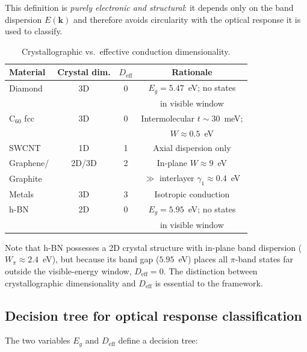\documentclass[twocolumn,showpacs,preprintnumbers,amsmath,amssymb,prb]{revtex4-2}
\begin{document}
This definition is \emph{purely electronic and structural}: it depends
only on the band dispersion $E(\bm{k})$ and therefore avoids
circularity with the optical response it is used to classify.

\begin{table}[h]
\caption{Crystallographic vs.\ effective conduction dimensionality.}
\label{tab:Deff}
\begin{ruledtabular}
\begin{tabular}{lccc}
  Material & Crystal dim. & $D_\mathrm{eff}$ & Rationale \\
  \hline
  Diamond      & 3D     & 0 & $E_g = 5.47$~eV; no states \\
               &        &   & in visible window \\
  C$_{60}$ fcc & 3D     & 0 & Intermolecular $t \sim 30$~meV; \\
               &        &   & $W \approx 0.5$~eV \\
  SWCNT        & 1D     & 1 & Axial dispersion only \\
  Graphene/    & 2D/3D  & 2 & In-plane $W \approx 9$~eV \\
  \quad Graphite &      &   & $\gg$ interlayer $\gamma_1 \approx 0.4$~eV \\
  Metals       & 3D     & 3 & Isotropic conduction \\
  h-BN         & 2D     & 0 & $E_g = 5.95$~eV; no states \\
               &        &   & in visible window \\
\end{tabular}
\end{ruledtabular}
\end{table}

Note that h-BN possesses a 2D crystal structure with in-plane band
dispersion ($W_\pi \approx 2.4$~eV), but because its band gap
($5.95$~eV) places all $\pi$-band states far outside the visible-energy
window, $D_\mathrm{eff} = 0$. The distinction between crystallographic
dimensionality and $D_\mathrm{eff}$ is essential to the framework.

\subsection{Decision tree for optical response classification}
\label{sec:tree}

The two variables $E_g$ and $D_\mathrm{eff}$ define a decision tree:
\end{document}
